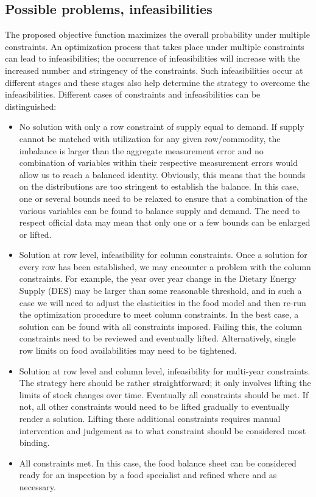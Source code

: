 \documentclass[nojss]{jss}
\begin{document}
\subsection{Possible problems, infeasibilities}
The proposed objective function maximizes the overall probability under multiple constraints. An optimization process that takes place under multiple constraints can lead to infeasibilities; the occurrence of infeasibilities will increase with the increased number and stringency of the constraints. Such infeasibilities occur at different stages and these stages also help determine the strategy to overcome the infeasibilities. 
Different cases of constraints and infeasibilities can be distinguished:
\begin{itemize}
\item No solution with only a row constraint of supply equal to demand. If supply cannot be matched with utilization for any given row/commodity, the imbalance is larger than the aggregate measurement error and no combination of variables within their respective measurement errors would allow us to reach a balanced identity. Obviously, this means that the bounds on the distributions are too stringent to establish the balance. In this case, one or several bounds need to be relaxed to ensure that a combination of the various variables can be found to balance supply and demand. The need to respect official data may mean that only one or a few bounds can be enlarged or lifted. 
\item Solution at row level, infeasibility for column constraints. Once a solution for every row has been established, we may encounter a problem with the column constraints.  For example, the year over year change in the Dietary Energy Supply (DES) may be larger than some reasonable threshold, and in such a case we will need to adjust the elasticities in the food model and then re-run the optimization procedure to meet column constraints. In the best case, a solution can be found with all constraints imposed. Failing this, the column constraints need to be reviewed and eventually lifted. Alternatively, single row limits on food availabilities may need to be tightened. 
\item Solution at row level and column level, infeasibility for multi-year constraints. The strategy here should be rather straightforward; it only involves lifting the limits of stock changes over time. Eventually all constraints should be met. If not, all other constraints would need to be lifted gradually to eventually render a solution. Lifting these additional constraints requires manual intervention and judgement as to what constraint should be considered most binding.
\item All constraints met. In this case, the food balance sheet can be considered ready for an inspection by a food specialist and refined where and as necessary. 
\end{itemize}
\end{document}

